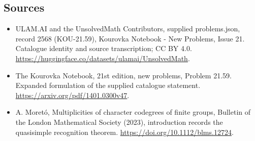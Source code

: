 \documentclass[11pt,a4paper]{article}
\begin{document}
\subsection{Sources}
\begin{itemize}
\item[S1] ULAM.AI and the UnsolvedMath Contributors, supplied problems.json, record 2568 (KOU-21.59), Kourovka Notebook - New Problems, Issue 21. Catalogue identity and source transcription; CC BY 4.0.
\url{https://huggingface.co/datasets/ulamai/UnsolvedMath}.
\item[S2] The Kourovka Notebook, 21st edition, new problems, Problem 21.59. Expanded formulation of the supplied catalogue statement.
\url{https://arxiv.org/pdf/1401.0300v47}.
\item[S3] A. Moretó, Multiplicities of character codegrees of finite groups, Bulletin of the London Mathematical Society (2023), introduction records the quasisimple recognition theorem.
\url{https://doi.org/10.1112/blms.12724}.
\end{itemize}
\end{document}
